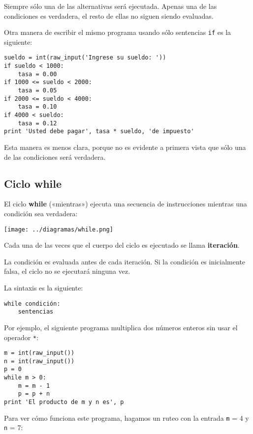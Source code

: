 Siempre sólo una de las alternativas será ejecutada. Apenas una de las
condiciones es verdadera, el resto de ellas no siguen siendo evaluadas.

Otra manera de escribir el mismo programa usando sólo sentencias
\lstinline!if! es la siguiente:

\begin{lstlisting}
sueldo = int(raw_input('Ingrese su sueldo: '))
if sueldo < 1000:
    tasa = 0.00
if 1000 <= sueldo < 2000:
    tasa = 0.05
if 2000 <= sueldo < 4000:
    tasa = 0.10
if 4000 < sueldo:
    tasa = 0.12
print 'Usted debe pagar', tasa * sueldo, 'de impuesto'
\end{lstlisting}

Esta manera es menos clara, porque no es evidente a primera vista que
sólo una de las condiciones será verdadera.

\subsection{Ciclo while}

El ciclo \textbf{while} («mientras») ejecuta una secuencia de
instrucciones mientras una condición sea verdadera:

\texttt{[image: ../diagramas/while.png]}

Cada una de las veces que el cuerpo del ciclo es ejecutado se llama
\textbf{iteración}.

La condición es evaluada antes de cada iteración. Si la condición es
inicialmente falsa, el ciclo no se ejecutará ninguna vez.

La sintaxis es la siguiente:

\begin{lstlisting}
while condición:
    sentencias
\end{lstlisting}

Por ejemplo, el siguiente programa multiplica dos números enteros sin
usar el operador \lstinline!*!:

\begin{lstlisting}
m = int(raw_input())
n = int(raw_input())
p = 0
while m > 0:
    m = m - 1
    p = p + n
print 'El producto de m y n es', p
\end{lstlisting}

Para ver cómo funciona este programa, hagamos un ruteo con la entrada
\lstinline!m! = 4 y \lstinline!n! = 7:

